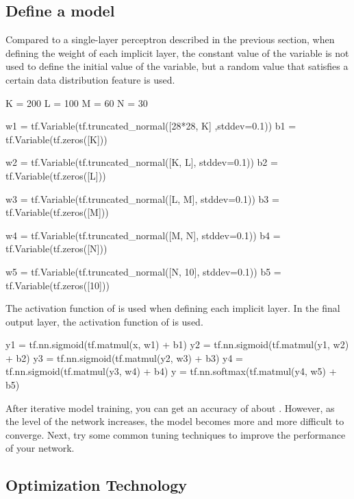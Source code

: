 \begin{content}
\begin{content}
\subsection{Define a model}
Compared to a single-layer perceptron described in the previous section, when defining the weight of each implicit layer, the constant value of the variable is not used to define the initial value of the variable, but a random value that satisfies a certain data distribution feature is used.

\begin{leftbar}
\begin{python}
K = 200
L = 100
M = 60
N = 30

w1 = tf.Variable(tf.truncated_normal([28*28, K] ,stddev=0.1)) 
b1 = tf.Variable(tf.zeros([K]))

w2 = tf.Variable(tf.truncated_normal([K, L], stddev=0.1))
b2 = tf.Variable(tf.zeros([L]))

w3 = tf.Variable(tf.truncated_normal([L, M], stddev=0.1)) 
b3 = tf.Variable(tf.zeros([M]))

w4 = tf.Variable(tf.truncated_normal([M, N], stddev=0.1)) 
b4 = tf.Variable(tf.zeros([N]))

w5 = tf.Variable(tf.truncated_normal([N, 10], stddev=0.1)) 
b5 = tf.Variable(tf.zeros([10]))
\end{python}
\end{leftbar}

The activation function of  is used when defining each implicit layer. In the final output layer, the activation function of  is used.

\begin{leftbar}
\begin{python}
y1 = tf.nn.sigmoid(tf.matmul(x,  w1) + b1)
y2 = tf.nn.sigmoid(tf.matmul(y1, w2) + b2)
y3 = tf.nn.sigmoid(tf.matmul(y2, w3) + b3)
y4 = tf.nn.sigmoid(tf.matmul(y3, w4) + b4)
y  = tf.nn.softmax(tf.matmul(y4, w5) + b5)
\end{python}
\end{leftbar}

After iterative model training, you can get an accuracy of about . However, as the level of the network increases, the model becomes more and more difficult to converge. Next, try some common tuning techniques to improve the performance of your network.


\subsection{Optimization Technology}


\end{content}
\end{content}
